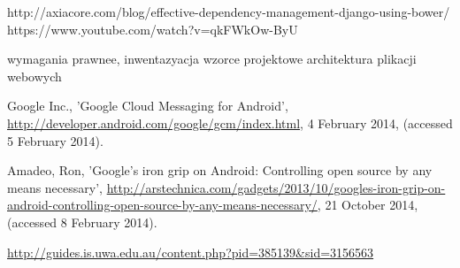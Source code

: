 \documentclass[a4paper,12pt,twoside]{article}
\begin{document}
http://axiacore.com/blog/effective-dependency-management-django-using-bower/
https://www.youtube.com/watch?v=qkFWkOw-ByU

\newpage

wymagania prawnee, inwentazyacja
wzorce projektowe
architektura plikacji webowych


\newpage
{}
\listoffigures

\newpage
\raggedright
\begin{thebibliography}{9}


Google Inc., 'Google Cloud Messaging for Android', \url{http://developer.android.com/google/gcm/index.html}, 4 February 2014, (accessed 5 February 2014).

Amadeo, Ron, 'Google's iron grip on Android: Controlling open source by any means necessary', \url{http://arstechnica.com/gadgets/2013/10/googles-iron-grip-on-android-controlling-open-source-by-any-means-necessary/}, 21 October 2014, (accessed 8 February 2014).


\end{thebibliography}
\url{http://guides.is.uwa.edu.au/content.php?pid=385139&sid=3156563}
\end{document}
